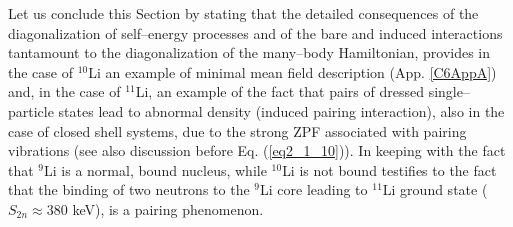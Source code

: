  
 Let us conclude this Section by stating that the detailed consequences  of the diagonalization of self--energy processes and of the bare and induced interactions  tantamount to the diagonalization of the many--body Hamiltonian, provides in the case of $^{10}$Li an example of minimal mean field description  (App. \ref{C6AppA}) and, in the case of $^{11}$Li, an example of the fact that pairs of dressed single--particle states lead to abnormal density (induced pairing interaction), also in the case of closed shell systems, due to the strong ZPF associated with pairing vibrations (see also discussion before Eq. (\ref{eq2_1_10})). In keeping with the fact that $^9$Li is a normal, bound nucleus, while $^{10}$Li is not bound testifies to the fact that the binding of two neutrons to the $^9$Li core leading to $^{11}$Li ground state ($S_{2n}\approx 380$ keV), is a pairing phenomenon. 
